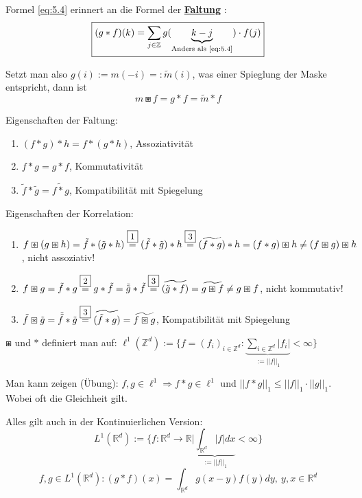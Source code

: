 \documentclass{article}
\theoremstyle{plain}
\theoremstyle{definition}
\numberwithin{equation}{section}
\newcommand{\norm}[1] {
\left|\left| #1 \right|\right|
}
\newcommand{\abs}[1] {
\left| #1 \right|
}
\newcommand{\R}[0] {
\mathbb R
}
\newcommand{\Z}[0] {
    \mathbb Z
}
\newcommand{\mim}[1] {
\underline{\textbf{#1\index{#1}}}
}
\newcommand{\C}[0]{
    \cdot
}
\begin{document}
        Formel \eqref{eq:5.4} erinnert an die Formel der \mim{Faltung}:
        \begin{equation}\label{eq:5.5}
            \framebox{$\displaystyle (g * f)(k) = \sum_{j \in \Z} g(\underbrace{k-j}_{\text{Anders als \eqref{eq:5.4}}}) \cdot f(j)$}
        \end{equation}

        Setzt man also $g(i) := m(-i) =: \tilde m(i)$, was einer Spieglung der Maske entspricht, dann ist
        \[m \boxast f = g * f = \tilde m * f\]

        Eigenschaften der Faltung:
        \begin{enumerate}[label=\framebox{\arabic *}]
            \item $(f * g) * h = f * (g* h)$, Assoziativität
            \item $f*g=g*f$, Kommutativität
            \item $\tilde f * \tilde g = \widetilde{f * g}$, Kompatibilität mit Spiegelung
        \end{enumerate}
        Eigenschaften der Korrelation:
        \begin{enumerate}[label=\framebox{\arabic *'}]
            \item $f \boxast (g \boxast h) = \tilde f * ( \tilde g* h) \overset{\framebox{\small 1}}{=} ( \tilde f * \tilde g) * h \overset{\framebox{\small 3}}{=} (\widetilde{f * g}) * h = (f * g) \boxast h \neq (f \boxast g) \boxast h$, nicht assoziativ!
            \item $f \boxast g = \tilde f * g \overset{\framebox{\small 2}}{=} g * \tilde f = \tilde{\tilde g} * \tilde f \overset{\framebox{\small 3}}{=} \widetilde{(\tilde g * f)} = \widetilde{g \boxast f} \neq g \boxast f$, nicht kommutativ!
            \item $\tilde f \boxast \tilde g = \tilde{\tilde f} * \tilde g \overset{\framebox{\small 3}}{=} \widetilde{(\tilde f * g)} = \widetilde{f \boxast g}$, Kompatibilität mit Spiegelung
        \end{enumerate}
	
	$\boxast$ und $*$ definiert man auf: $\ell^1(\Z^d):=\{f=(f_i)_{i \in \Z^d} : \underbrace{\sum_{i \in \Z^d}\abs{f_i}}_{:=\norm{f}_1} < \infty\}$

	Man kann zeigen (Übung): $f,g \in \ell^1 \Rightarrow f * g \in \ell^1$ und $\norm{f * g}_1 \leq \norm{f}_1 \C \norm{g}_1$.
    Wobei oft die Gleichheit gilt.
    
    Alles gilt auch in der Kontinuierlichen Version:
    \[L^1(\R^d) := \{f:\R^d \to \R | \underbrace{\int_{\R^d}\abs{f} dx}_{:=\norm{f}_1} < \infty\}\]
    \[f,g \in L^1(\R^d): (g*f)(x)=\int_{\R^d}g(x-y)f(y) dy, \ y,x \in \R^d\]
\end{document}
